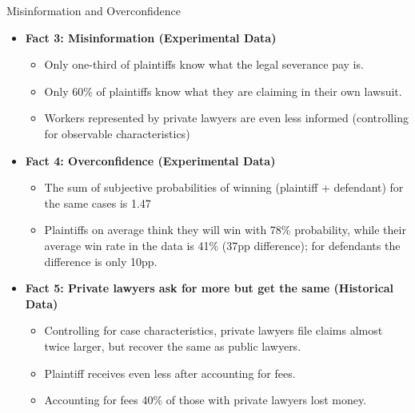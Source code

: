 \documentclass[9pt]{beamer}
\begin{document}
\begin{frame}{Misinformation and Overconfidence}
\begin{itemize}
 \item \textbf{Fact 3: Misinformation (Experimental Data)}
        \vspace{0.05in}
        \begin{itemize}
            \item Only one-third of plaintiffs know what the legal severance pay is.
            \vspace{0.05in}
            \item Only 60\% of plaintiffs know what they are claiming in their own lawsuit. 
            \vspace{0.05in}
            \item Workers represented by private lawyers are even less informed (controlling for observable characteristics)
        \end{itemize}
    
    \pause
   \vspace{5mm}
  \item  \textbf{Fact 4: Overconfidence (Experimental Data)} 
  
  \begin{itemize}
      \item The sum of subjective probabilities of winning (plaintiff + defendant) for the same cases is 1.47
      \item Plaintiffs on average think they will win with 78\% probability, while their average win rate in the data is 41\% (\alert{37pp difference}); for defendants the difference is only 10pp.
      
  \end{itemize}
  
  \pause
  \vspace{5mm}
  \item \textbf{Fact 5: Private lawyers ask for more but get the same (Historical Data)} 
         \vspace{2mm}
      \begin{itemize}
          \item Controlling for case characteristics, private lawyers file claims almost twice larger, but recover the same as public lawyers. 
          \item Plaintiff receives even less after accounting for fees.
          \item Accounting for fees 40\% of those with private lawyers lost money.
      \end{itemize}  
  
\end{itemize}
\end{frame}
 
\end{document}
